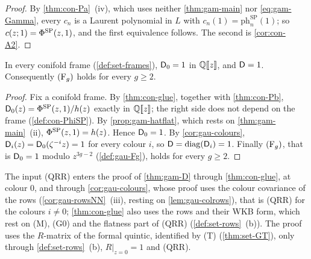 \begin{proof}
By \cref{thm:con-Pa}~(iv), which uses neither \cref{thm:gam-main} nor \eqref{eq:gam-Gamma}, every $c_n$ is a Laurent polynomial in $L$ with $c_n(1)=\mathrm{ph}^{\mathrm{SP}}_n(1)$; so $c(z;1)=\Phi^{\mathrm{SP}}(z,1)$, and the first equivalence follows. The second is \cref{cor:con-A2}.
\end{proof}

\begin{thm}
\label{thm:gam-D}
In every conifold frame (\cref{def:set-frames}), $\mathsf{D}_0=1$ in $\mathbb{Q}[\![ z ]\!]$, and $\mathsf{D}=1$. Consequently $(\mathrm{F}_{g})$ holds for every $g\geq 2$.
\end{thm}

\begin{proof}
Fix a conifold frame. By \cref{thm:con-glue}, together with \cref{thm:con-Pb}, $\mathsf{D}_0(z)=\Phi^{\mathrm{SP}}(z,1)/h(z)$ exactly in $\mathbb{Q}[\![ z ]\!]$; the right side does not depend on the frame (\cref{def:con-PhiSP}). By \cref{prop:gam-hatflat}, which rests on \cref{thm:gam-main}~(ii), $\Phi^{\mathrm{SP}}(z,1)=h(z)$. Hence $\mathsf{D}_0=1$. By \cref{cor:gau-colours}, $\mathsf{D}_i(z)=\mathsf{D}_0(\zeta^{-i}z)=1$ for every colour $i$, so $\mathsf{D}=\operatorname{diag}(\mathsf{D}_i)=1$. Finally $(\mathrm{F}_{g})$, that is $\mathsf{D}_0=1$ modulo $z^{3g-2}$ (\cref{def:gau-Fg}), holds for every $g\geq 2$.
\end{proof}

The input (QRR) enters the proof of \cref{thm:gam-D} through \cref{thm:con-glue}, at colour $0$, and through \cref{cor:gau-colours}, whose proof uses the colour covariance of the rows (\cref{cor:gau-rowsNN}~(iii), resting on \cref{lem:gau-colrows}), that is (QRR) for the colours $i\neq0$; \cref{thm:con-glue} also uses the rows and their WKB form, which rest on (M), (G0) and the flatness part of (QRR) (\cref{def:set-rows}~(b)). The proof uses the $R$-matrix of the formal quintic, identified by (T) (\cref{thm:set-GT}), only through \cref{def:set-rows}~(b), $R|_{z=0}=1$ and (QRR).


